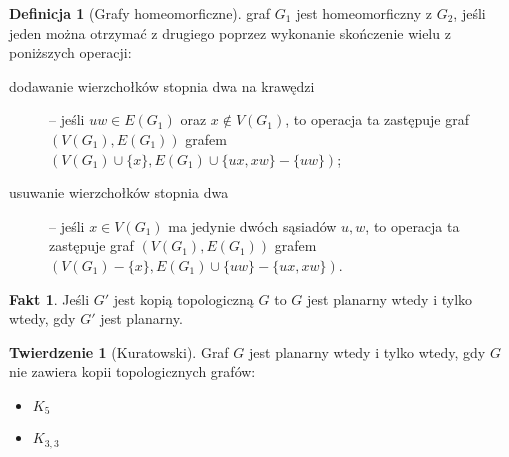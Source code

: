 \documentclass[a4paper,12pt]{article}
\theoremstyle{definition}%
\newtheorem{theorem}{Twierdzenie}%
\newtheorem*{fact*}{Fakt} %
\theoremstyle{definition}
\newtheorem{definition}{Definicja}%
\theoremstyle{problem}
\begin{document}
\begin{definition}[Grafy homeomorficzne]
graf $G_1$ jest homeomorficzny z $G_2$, jeśli jeden można otrzymać z drugiego poprzez wykonanie skończenie wielu z poniższych operacji:
\begin{description}
\item[dodawanie wierzchołków stopnia dwa na krawędzi] – jeśli $uw \in E (G_1)$ oraz $x \not \in V (G_1)$, to operacja ta zastępuje graf $(V (G_1), E (G_1))$ grafem $(V (G_1) \cup \{x\} , E (G_1) \cup \{ux, xw\} - \{uw\})$;
\item[usuwanie wierzchołków stopnia dwa] – jeśli $x\in V (G_1)$ ma jedynie dwóch sąsiadów $u, w$, to operacja ta zastępuje graf $(V (G_1), E (G_1))$ grafem $(V (G_1) - \{x\} , E (G_1) \cup \{uw\} - \{ux, xw\})$.
\end{description}
\end{definition}

\begin{fact*}
Jeśli $G'$ jest kopią topologiczną $G$ to $G$ jest planarny wtedy i tylko wtedy, gdy $G'$ jest planarny.
\end{fact*}

\begin{theorem}[Kuratowski]\label{the:Kuratowski}
Graf $G$ jest planarny wtedy i tylko wtedy, gdy $G$ nie zawiera kopii topologicznych grafów:
\begin{itemize}
\item $K_5$
\item $K_{3,3}$
\end{itemize}
\end{theorem}
\end{document}
